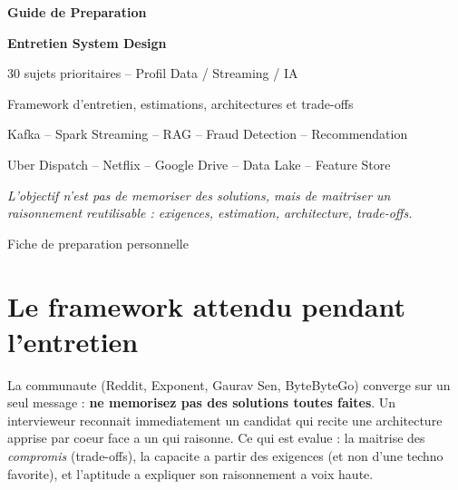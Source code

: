 \documentclass[11pt,a4paper]{article}
\begin{document}
\begin{titlepage}
  \centering
  \vspace*{2cm}
  {\Huge\bfseries\color{archdark} Guide de Preparation\par}
  \vspace{0.5cm}
  {\LARGE\bfseries\color{archviolet} Entretien System Design\par}
  \vspace{0.3cm}
  {\Large 30 sujets prioritaires -- Profil Data / Streaming / IA\par}
  \vspace{1.5cm}
  {\large Framework d'entretien, estimations, architectures et trade-offs\par}
  \vspace{0.3cm}
  {\large Kafka -- Spark Streaming -- RAG -- Fraud Detection -- Recommendation\par}
  {\large Uber Dispatch -- Netflix -- Google Drive -- Data Lake -- Feature Store\par}
  \vfill
  {\normalsize\textit{L'objectif n'est pas de memoriser des solutions, mais de maitriser un raisonnement reutilisable : exigences, estimation, architecture, trade-offs.}\par}
  \vspace{1cm}
  {\small Fiche de preparation personnelle\par}
\end{titlepage}

\tableofcontents
\newpage

\section{Le framework attendu pendant l'entretien}

\begin{cle}
La communaute (Reddit, Exponent, Gaurav Sen, ByteByteGo) converge sur un seul message : \textbf{ne memorisez pas des solutions toutes faites}. Un intervieweur reconnait immediatement un candidat qui recite une architecture apprise par coeur face a un qui raisonne. Ce qui est evalue : la maitrise des \emph{compromis} (trade-offs), la capacite a partir des exigences (et non d'une techno favorite), et l'aptitude a expliquer son raisonnement a voix haute.
\end{cle}
\end{document}

